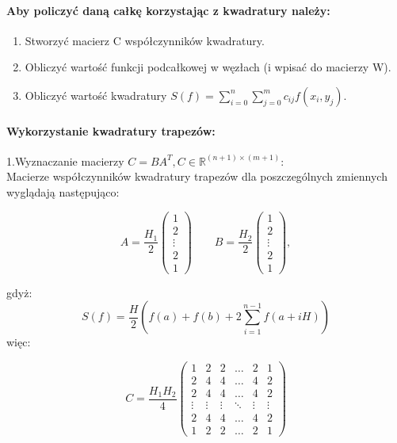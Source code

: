 \documentclass{article}
\begin{document}
\paragraph{Aby policzyć daną całkę korzystając z kwadratury należy:}
\begin{enumerate}
    \item Stworzyć macierz C współczynników kwadratury.
    \item Obliczyć wartość funkcji podcałkowej w węzłach (i wpisać do macierzy W).
    \item Obliczyć wartość kwadratury $S(f) = \sum_{i=0}^{n}\sum_{j=0}^{m}c_{ij}f(x_i,y_j)$.
\end{enumerate}

\paragraph{Wykorzystanie kwadratury trapezów:\\}

1.Wyznaczanie macierzy $C = BA^T, C\in \mathbb{R}^{(n+1) \times (m+1)}$: \\
Macierze współczynników kwadratury trapezów dla poszczególnych zmiennych wyglądają następująco: 

\[A = \frac{H_1}{2} \begin{pmatrix}
    1\\
    2\\
    \vdots\\
    2\\
    1
\end{pmatrix}
\qquad
B = \frac{H_2}{2} \begin{pmatrix}
    1\\
    2\\
    \vdots\\
    2\\
    1
\end{pmatrix},\]

gdyż:
\[S(f) = \frac{H}{2}(f(a)+f(b)+2\sum_{i=1}^{n-1}f(a+iH))\]
więc:

\[C = \frac{H_1H_2}{4}
\begin{pmatrix}
    1 & 2 & 2 & \dots & 2 & 1 \\
    2 & 4 & 4 & \dots & 4 & 2 \\
    2 & 4 & 4 & \dots & 4 & 2 \\
    \vdots & \vdots & \vdots & \ddots & \vdots & \vdots \\
    2 & 4 & 4 & \dots & 4 & 2 \\
     1 & 2 & 2 & \dots & 2 & 1
\end{pmatrix}\]
\end{document}
